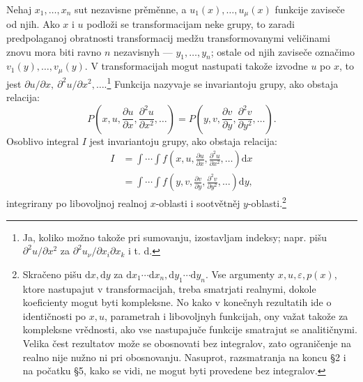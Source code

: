 \documentclass[11pt]{article}
\providecommand{\eps}{\varepsilon}
\providecommand{\p}{\partial}
\providecommand{\dd}{\mathrm d}
\begin{document}
Nehaj \(x_1,\ldots,x_n\) sut nezavisne prěměnne, a \(u_1(x),\ldots,u_\mu(x)\) funkcije zaviseče od njih. Ako \(x\) i \(u\) podloži se transformacijam neke grupy, to zaradi predpolaganoj obratnosti transformacij medžu transformovanymi veličinami znovu mora biti ravno \(n\) nezavisnyh --- \(y_1,\ldots,y_n\); ostale od njih zaviseče označimo \(v_1(y),\ldots,v_\mu(y)\). V transformacijah mogut nastupati takože izvodne \(u\) po \(x\), to jest \(\p u/\p x,\ \p^2u/\p x^2,\ldots\).\footnote{Ja, koliko možno takože pri sumovanju, izostavljam indeksy; napr. pišu \(\p^2u/\p x^2\) za \(\p^2u_\nu/\p x_i\p x_k\) i t. d.} Funkcija nazyvaje se invariantoju grupy, ako obstaja relacija:
\[
P\!\left(x,u,\frac{\p u}{\p x},\frac{\p^2u}{\p x^2},\ldots\right)
 =
P\!\left(y,v,\frac{\p v}{\p y},\frac{\p^2v}{\p y^2},\ldots\right).
\]
Osoblivo integral \(I\) jest invariantoju grupy, ako obstaja relacija:
\begin{equation}
\begin{aligned}
I&=\int\!\cdots\!\int f\!\left(x,u,\frac{\p u}{\p x},\frac{\p^2u}{\p x^2},\ldots\right)\dd x\\
 &=\int\!\cdots\!\int f\!\left(y,v,\frac{\p v}{\p y},\frac{\p^2v}{\p y^2},\ldots\right)\dd y,
\end{aligned}
\tag{1}
\end{equation}
integrirany po libovoljnoj realnoj \(x\)-oblasti i sootvětněj \(y\)-oblasti.\footnote{Skračeno pišu \(\dd x,\dd y\) za \(\dd x_1\cdots \dd x_n,\dd y_1\cdots \dd y_n\). Vse argumenty \(x,u,\eps,p(x)\), ktore nastupajut v transformacijah, treba smatrjati realnymi, dokole koeficienty mogut byti kompleksne. No kako v konečnyh rezultatih ide o identičnosti po \(x,u\), parametrah i libovoljnyh funkcijah, ony važat takože za kompleksne vrědnosti, ako vse nastupajuče funkcije smatrajut se analitičnymi. Velika čest rezultatov može se obosnovati bez integralov, zato ograničenje na realno nije nužno ni pri obosnovanju. Nasuprot, razsmatranja na koncu \S{}2 i na počatku \S{}5, kako se vidi, ne mogut byti provedene bez integralov.}
\end{document}
